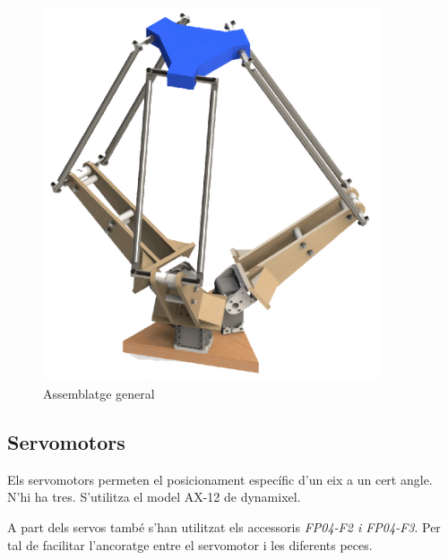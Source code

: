 \documentclass[a4paper, 12pt]{article}
\begin{document}
\begin{figure}[h!]
\centering
\includegraphics[width=10cm]{./imgComp/general}
\caption{Assemblatge general}
\end{figure}



\newpage
\subsection{Servomotors}
Els servomotors permeten el posicionament específic d'un eix a un cert angle. N'hi ha tres. S'utilitza el model AX-12 de dynamixel. 

A part dels servos també s'han utilitzat els accessoris \emph{FP04-F2 i FP04-F3}. Per tal de facilitar l'ancoratge entre el servomotor i les diferents peces.
\end{document}
